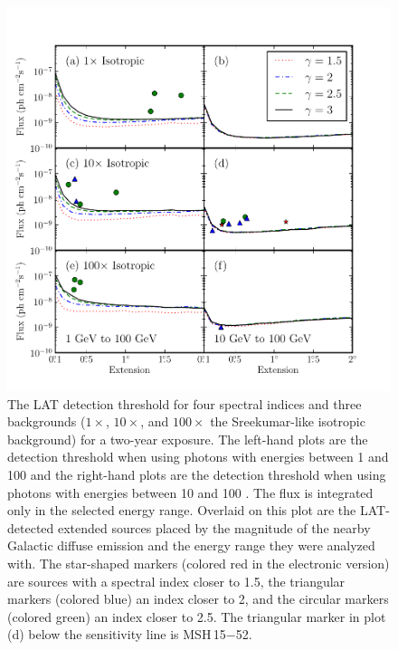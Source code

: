 \begin{figure}[htbp]
  \includegraphics{chapters/extended_analysis/figures/mc_plots/all_sensitivity_color.pdf}
  \caption{The LAT detection threshold for four spectral indices and three
  backgrounds ($1\times$, $10\times$, and $100\times$ the Sreekumar-like
  isotropic background) for a two-year exposure. The left-hand plots are
  the detection threshold when using photons with energies between 1 \gev
  and 100 \gev and the right-hand plots are the detection threshold when
  using photons with energies between 10 \gev and 100 \gev.  The flux
  is integrated only in the selected energy range.  Overlaid on this
  plot are the LAT-detected extended sources placed by the magnitude of
  the nearby Galactic diffuse emission and the energy range they were
  analyzed with.  The star-shaped markers (colored red in the electronic
  version) are sources with a spectral index closer to 1.5, the triangular
  markers (colored blue) an index closer to 2, and the circular markers
  (colored green) an index closer to 2.5.  The triangular marker in plot
  (d) below the sensitivity line is MSH\,15$-$52.}
\end{figure}

